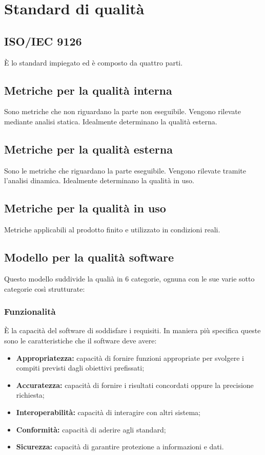 \section{Standard di qualit\`a}
\subsection{ISO/IEC 9126}
\`E lo standard impiegato ed \`e composto da quattro parti.
\subsection{Metriche per la qualit\`a interna}
Sono metriche che non riguardano la parte non eseguibile. Vengono rilevate mediante analisi statica. Idealmente determinano la qualit\`a esterna.
\subsection{Metriche per la qualit\`a esterna}
Sono le metriche che riguardano la parte eseguibile. Vengono rilevate tramite l'analisi dinamica. Idealmente determinano la qualit\`a in uso.
\subsection{Metriche per la qualit\`a in uso}
Metriche applicabili al prodotto finito e utilizzato in condizioni reali.
\subsection{Modello per la qualit\`a software}
Questo modello suddivide la quali\`a in 6 categorie, ognuna con le sue varie sotto categorie cos\`i strutturate:
\subsubsection{Funzionalit\`a}
\`E la capacit\`a del software di soddisfare i requisiti. In maniera pi\`u specifica queste sono le caratteristiche che il software deve avere:
\begin{itemize}
    \item \textbf{Appropriatezza:} capacit\`a di fornire funzioni appropriate per svolgere i compiti previsti dagli obiettivi prefissati;
    \item \textbf{Accuratezza:} capacit\`a di fornire i risultati concordati oppure la precisione richiesta;
    \item \textbf{Interoperabilit\`a:} capacit\`a  di interagire con altri sistema;
    \item \textbf{Conformit\`a:} capacit\`a di aderire agli standard;
    \item \textbf{Sicurezza:} capacit\`a di garantire protezione a informazioni e dati.
\end{itemize}

